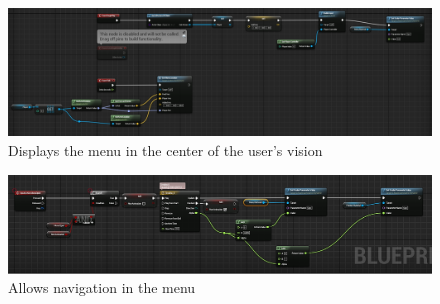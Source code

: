 	\begin{figure}
		\caption{Displays the menu in the center of the user's vision}
		\includegraphics[scale=0.5]{Menu1.png}
		\centering
	\end{figure}
	\begin{figure}
		\caption{Allows navigation in the menu}
		\includegraphics[scale=0.5]{Menu2.png}
		\centering
	\end{figure}

